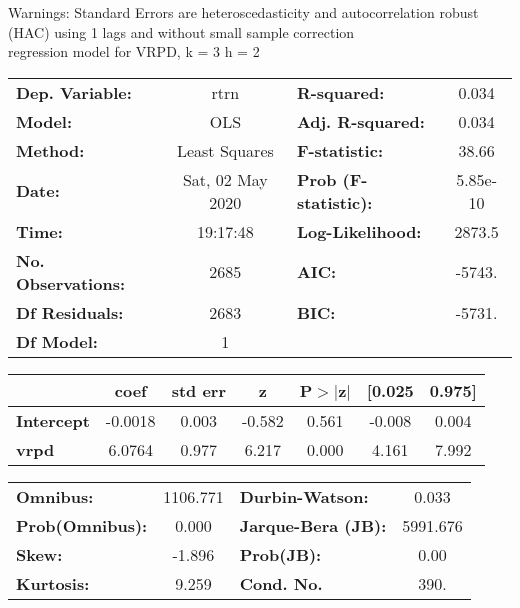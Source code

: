Warnings: \newline
 [1] Standard Errors are heteroscedasticity and autocorrelation robust (HAC) using 1 lags and without small sample correction\\ 

regression model for VRPD, k = 3 h = 2\begin{center}
\begin{tabular}{lclc}
\toprule
\textbf{Dep. Variable:}    &       rtrn       & \textbf{  R-squared:         } &     0.034   \\
\textbf{Model:}            &       OLS        & \textbf{  Adj. R-squared:    } &     0.034   \\
\textbf{Method:}           &  Least Squares   & \textbf{  F-statistic:       } &     38.66   \\
\textbf{Date:}             & Sat, 02 May 2020 & \textbf{  Prob (F-statistic):} &  5.85e-10   \\
\textbf{Time:}             &     19:17:48     & \textbf{  Log-Likelihood:    } &    2873.5   \\
\textbf{No. Observations:} &        2685      & \textbf{  AIC:               } &    -5743.   \\
\textbf{Df Residuals:}     &        2683      & \textbf{  BIC:               } &    -5731.   \\
\textbf{Df Model:}         &           1      & \textbf{                     } &             \\
\bottomrule
\end{tabular}
\begin{tabular}{lcccccc}
                   & \textbf{coef} & \textbf{std err} & \textbf{z} & \textbf{P$> |$z$|$} & \textbf{[0.025} & \textbf{0.975]}  \\
\midrule
\textbf{Intercept} &      -0.0018  &        0.003     &    -0.582  &         0.561        &       -0.008    &        0.004     \\
\textbf{vrpd}      &       6.0764  &        0.977     &     6.217  &         0.000        &        4.161    &        7.992     \\
\bottomrule
\end{tabular}
\begin{tabular}{lclc}
\textbf{Omnibus:}       & 1106.771 & \textbf{  Durbin-Watson:     } &    0.033  \\
\textbf{Prob(Omnibus):} &   0.000  & \textbf{  Jarque-Bera (JB):  } & 5991.676  \\
\textbf{Skew:}          &  -1.896  & \textbf{  Prob(JB):          } &     0.00  \\
\textbf{Kurtosis:}      &   9.259  & \textbf{  Cond. No.          } &     390.  \\
\bottomrule
\end{tabular}
\end{center}

